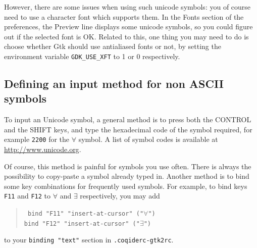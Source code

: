 However, there are some issues when using such unicode symbols: you of
course need to use a character font which supports them. In the Fonts
section of the preferences, the Preview line displays some unicode symbols, so
you could figure out if the selected font is OK. Related to this, one
thing you may need to do is choose whether Gtk should use antialiased
fonts or not, by setting the environment variable \verb|GDK_USE_XFT|
to 1 or 0 respectively.

\subsection{Defining an input method for non ASCII symbols}

To input an Unicode symbol, a general method is to press both the
CONTROL and the SHIFT keys, and type the hexadecimal code of the
symbol required, for example \verb|2200| for the $\forall$ symbol.
A list of symbol codes is available at \url{http://www.unicode.org}. 

Of course, this method is painful for symbols you use often. There is
always the possibility to copy-paste a symbol already typed in.
Another method is to bind some key combinations for frequently used
symbols. For example, to bind keys \verb|F11| and \verb|F12| to
$\forall$ and $\exists$ respectively, you may add
\begin{quote}\tt
  bind "F11" {"insert-at-cursor" ("$\forall$")}\\
  bind "F12" {"insert-at-cursor" ("$\exists$")}
\end{quote}
to your \verb|binding "text"| section in \verb|.coqiderc-gtk2rc|.



